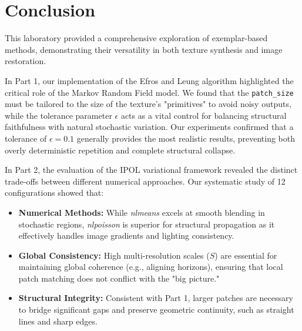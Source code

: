 \documentclass{article}
\begin{document}
\section{Conclusion}
\label{sec:Conclusion}
This laboratory provided a comprehensive exploration of exemplar-based methods, demonstrating their versatility in both texture synthesis and image restoration. 

In Part 1, our implementation of the Efros and Leung algorithm highlighted the critical role of the Markov Random Field model. We found that the \texttt{patch\_size} must be tailored to the size of the texture's "primitives" to avoid noisy outputs, while the tolerance parameter $\epsilon$ acts as a vital control for balancing structural faithfulness with natural stochastic variation. Our experiments confirmed that a tolerance of $\epsilon = 0.1$ generally provides the most realistic results, preventing both overly deterministic repetition and complete structural collapse.

In Part 2, the evaluation of the IPOL variational framework revealed the distinct trade-offs between different numerical approaches. Our systematic study of 12 configurations showed that:
\begin{itemize}
    \item \textbf{Numerical Methods:} While \textit{nlmeans} excels at smooth blending in stochastic regions, \textit{nlpoisson} is superior for structural propagation as it effectively handles image gradients and lighting consistency.
    \item \textbf{Global Consistency:} High multi-resolution scales ($S$) are essential for maintaining global coherence (e.g., aligning horizons), ensuring that local patch matching does not conflict with the "big picture."
    \item \textbf{Structural Integrity:} Consistent with Part 1, larger patches are necessary to bridge significant gaps and preserve geometric continuity, such as straight lines and sharp edges.
\end{itemize}




\end{document}
